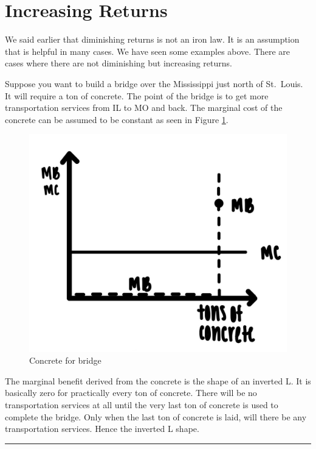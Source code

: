\documentclass[
]{book}
\begin{document}
\hypertarget{increasing-returns}{%
\section{Increasing Returns}\label{increasing-returns}}

We said earlier that diminishing returns is not an iron law. It is an assumption that is helpful in many cases. We have seen some examples above. There are cases where there are not diminishing but increasing returns.

Suppose you want to build a bridge over the Mississippi just north of St.~Louis. It will require a ton of concrete. The point of the bridge is to get more transportation services from IL to MO and back. The marginal cost of the concrete can be assumed to be constant as seen in Figure \ref{fig:rationalchoice09}.

\begin{figure}

{\centering \includegraphics[width=0.75\linewidth]{img/rationalchoice/fig9} 

}

\caption{Concrete for bridge}\label{fig:rationalchoice09}
\end{figure}

The marginal benefit derived from the concrete is the shape of an inverted L. It is basically zero for practically every ton of concrete. There will be no transportation services at all until the very last ton of concrete is used to complete the bridge. Only when the last ton of concrete is laid, will there be any transportation services. Hence the inverted L shape.

\begin{center}\rule{0.5\linewidth}{0.5pt}\end{center}
\end{document}
